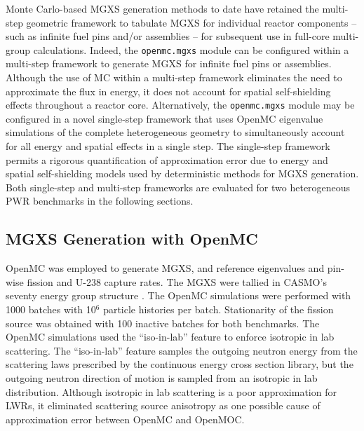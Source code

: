 Monte Carlo-based MGXS generation methods to date have retained the multi-step geometric framework to tabulate MGXS for individual reactor components -- such as infinite fuel pins and/or assemblies -- for subsequent use in full-core multi-group calculations. Indeed, the \texttt{openmc.mgxs} module can be configured within a multi-step framework to generate MGXS for infinite fuel pins or assemblies. Although the use of MC within a multi-step framework eliminates the need to approximate the flux in energy, it does not account for spatial self-shielding effects throughout a reactor core. Alternatively, the \texttt{openmc.mgxs} module may be configured in a novel single-step framework that uses OpenMC eigenvalue simulations of the complete heterogeneous geometry to simultaneously account for all energy and spatial effects in a single step. The single-step framework permits a rigorous quantification of approximation error due to energy and spatial self-shielding models used by deterministic methods for MGXS generation. Both single-step and multi-step frameworks are evaluated for two heterogeneous PWR benchmarks in the following sections.



\subsection{MGXS Generation with OpenMC}
\label{subsec:openmc}

OpenMC was employed to generate MGXS, and reference eigenvalues and pin-wise fission and U-238 capture rates. The MGXS were tallied in CASMO's seventy energy group structure \cite{rhodes2006casmo}. The OpenMC simulations were performed with 1000 batches with 10$^{6}$ particle histories per batch. Stationarity of the fission source was obtained with 100 inactive batches for both benchmarks. The OpenMC simulations used the ``iso-in-lab'' feature to enforce isotropic in lab scattering. The ``iso-in-lab'' feature samples the outgoing neutron energy from the scattering laws prescribed by the continuous energy cross section library, but the outgoing neutron direction of motion is sampled from an isotropic in lab distribution. Although isotropic in lab scattering is a poor approximation for LWRs, it eliminated scattering source anisotropy as one possible cause of approximation error between OpenMC and OpenMOC. 

